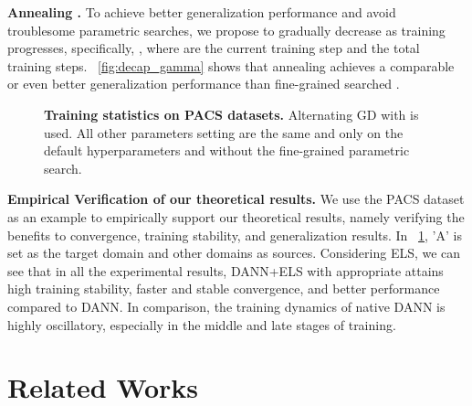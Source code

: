 \documentclass{article} \usepackage{iclr2023_conference,times}
\newcommand{\abbr}[0]{DANN+ELS\xspace}
\newcommand{\ls}[0]{ELS\xspace}
\begin{document}
\textbf{Annealing .} To achieve better generalization performance and avoid troublesome parametric searches, we propose to gradually decrease  as training progresses, specifically, , where  are the current training step and the total training steps. \figurename~\ref{fig:decap_gamma} shows that annealing  achieves a comparable or even better generalization performance than fine-grained searched .

\begin{figure}[h]
\centering


\centering
\caption{\textbf{Training statistics on PACS datasets.} Alternating GD with  is used. All other parameters setting are the same and only on the default hyperparameters
and without the fine-grained parametric search.} \label{fig:pacs_training}
\vspace{-0.2cm}
\end{figure}
\vspace{-0.2cm}
\textbf{Empirical Verification of our theoretical results.} We use the PACS dataset as an example to empirically support our theoretical results, namely verifying the benefits to convergence, training stability, and generalization results. In \figurename~\ref{fig:pacs_training}, 'A' is set as the target domain and other domains as sources. Considering \ls, we can see that in all the experimental results, \abbr with appropriate  attains high training stability, faster and stable convergence, and better performance compared to DANN. In comparison, the training dynamics of native DANN is highly oscillatory, especially in the middle and late stages of training.



\vspace{-2mm}
\section{Related Works}
\vspace{-0.2cm}
\end{document}
